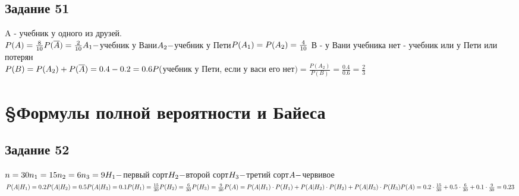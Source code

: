 \documentclass[12pt]{article}
\begin{document}
\newpage
\subsection{Задание 51}
A - учебник у одного из друзей.\\
$
P(A)=\frac{8}{10}\\
P( \overline A)=\frac{2}{10}\\
A_1 - $учебник у Вани$\\
A_2 - $учебник у Пети$\\
P(A_1)=P(A_2)=\frac{4}{10}\\
$
В - у Вани учебника нет - учебник или у Пети или потерян\\
$
P(B)=P(A_2)+P(\overline A)=0.4-0.2=0.6\\
P($учебник у Пети, если у васи его нет$)=
\frac{P(A_2)}{P(B)}=\frac{0.4}{0.6}=\frac{2}{3}
$

\newpage
\section{\S Формулы полной вероятности и Байеса}

\subsection{Задание 52}
$
n=30\\
n_1=15\\
n_2=6\\
n_3=9\\
H_1-$первый сорт$\\
H_2-$второй сорт$\\
H_3-$третий сорт$\\
A-$червивое$\\
P(A|H_1)=0.2\\
P(A|H_2)=0.5\\
P(A|H_3)=0.1\\
P(H_1)=\frac{15}{30}\\
P(H_2)=\frac{6}{30}\\
P(H_3)=\frac{9}{30}\\
P(A)=P(A|H_1)\cdot P(H_1)+P(A|H_2)\cdot P(H_2)+P(A|H_3)\cdot P(H_3)\\
P(A)=0.2\cdot \frac{15}{30} + 0.5 \cdot \frac{6}{30} + 0.1 \cdot \frac{9}{30}=0.23
$

\newpage
\end{document}
